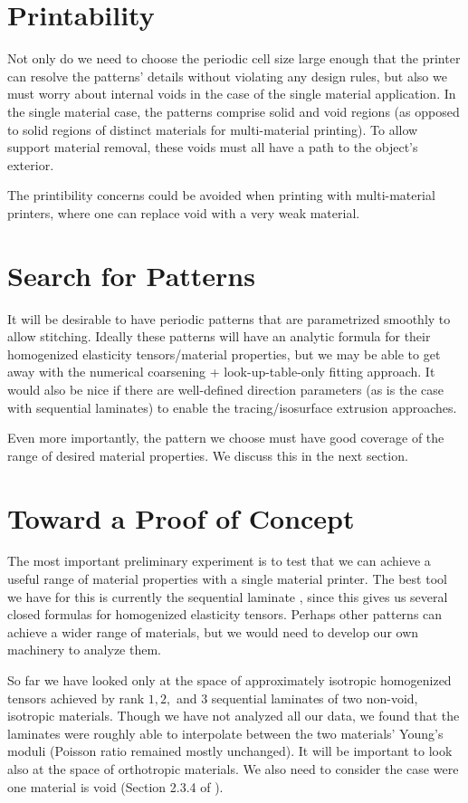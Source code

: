 \documentclass[10pt]{article}
\begin{document}
\section{Printability}
Not only do we need to choose the periodic cell size large enough that the
printer can resolve the patterns' details without violating any design rules,
but also we must worry about internal voids in the case of the single material
application. In the single material case, the patterns comprise solid and void
regions (as opposed to solid regions of distinct materials for multi-material
printing). To allow support material removal, these voids must all have a path
to the object's exterior.

The printibility concerns could be avoided when printing with multi-material
printers, where one can replace void with a very weak material.

\section{Search for Patterns}
It will be desirable to have periodic patterns that are
parametrized smoothly to allow stitching. Ideally these patterns will have
an analytic formula for their homogenized elasticity tensors/material
properties, but we may be able to get away with the numerical coarsening +
look-up-table-only fitting approach. It would also be nice if there are
well-defined direction parameters (as is the case with sequential laminates) to
enable the tracing/isosurface extrusion approaches.

Even more importantly, the pattern we choose must have good coverage of the
range of desired material properties. We discuss this in the next section.

\section{Toward a Proof of Concept}
The most important preliminary experiment is to test that we
can achieve a useful range of material properties with a single material
printer. The best tool we have for this is currently the sequential laminate
\cite{allaire2002shape}, since this gives us several closed formulas for
homogenized elasticity tensors. Perhaps other patterns can achieve a wider range
of materials, but we would need to develop our own machinery to analyze them.

So far we have looked only at the space of approximately isotropic homogenized
tensors achieved by rank $1, 2, $ and $3$ sequential laminates of two
non-void, isotropic materials. Though we have not analyzed all our data, we
found that the laminates were roughly able to interpolate between the two
materials' Young's moduli (Poisson ratio remained mostly unchanged). It will be
important to look also at the space of orthotropic materials. We also need to
consider the case were one material is void (Section 2.3.4 of
\cite{allaire2002shape}).
\end{document}
